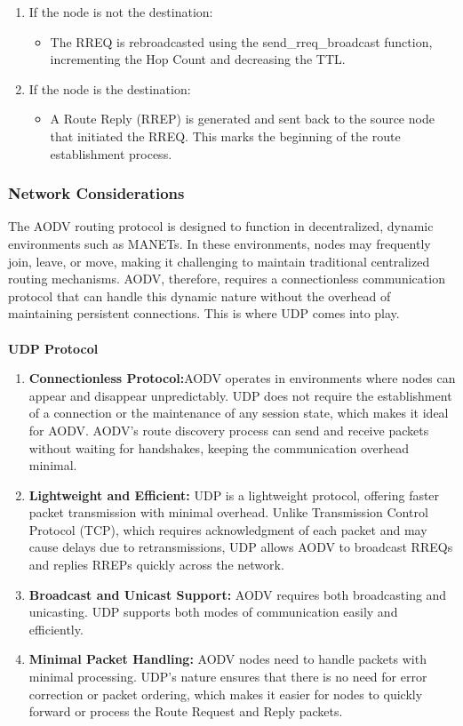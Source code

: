 \documentclass[]{nsm-thesis}
\begin{document}
\begin{enumerate}
    \item If the node is not the destination:
    \begin{itemize}
        \item The RREQ is rebroadcasted using the send\_rreq\_broadcast function, incrementing the Hop Count and decreasing the TTL.
    \end{itemize}
    \item If the node is the destination:
    \begin{itemize}
        \item A Route Reply (RREP) is generated and sent back to the source node that initiated the RREQ. This marks the beginning of the route establishment process.

    \end{itemize}
\end{enumerate}



\subsubsection{Network Considerations}
The AODV routing protocol is designed to function in decentralized, dynamic environments such as MANETs. In these environments, nodes may frequently join, leave, or move, making it challenging to maintain traditional centralized routing mechanisms. AODV, therefore, requires a connectionless communication protocol that can handle this dynamic nature without the overhead of maintaining persistent connections. This is where UDP comes into play.\\\\
{\large  \textbf{UDP Protocol}}
\begin{enumerate}
    \item \textbf{Connectionless Protocol:}AODV operates in environments where nodes can appear and disappear unpredictably. UDP does not require the establishment of a connection or the maintenance of any session state, which makes it ideal for AODV. AODV's route discovery process can send and receive packets without waiting for handshakes, keeping the communication overhead minimal.
    \item \textbf{Lightweight and Efficient:} UDP is a lightweight protocol, offering faster packet transmission with minimal overhead. Unlike Transmission Control Protocol (TCP), which requires acknowledgment of each packet and may cause delays due to retransmissions, UDP allows AODV to broadcast RREQs and replies RREPs quickly across the network.
    \item \textbf{Broadcast and Unicast Support:} AODV requires both broadcasting and unicasting. UDP supports both modes of communication easily and efficiently.
    \item \textbf{Minimal Packet Handling:} AODV nodes need to handle packets with minimal processing. UDP’s nature ensures that there is no need for error correction or packet ordering, which makes it easier for nodes to quickly forward or process the Route Request and Reply packets.
    
    
\end{enumerate}
\end{document}
